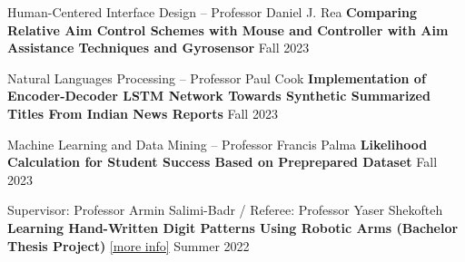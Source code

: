   \begin{cventries}
    \cventry
    {Human-Centered Interface Design -- Professor Daniel J. Rea}
    {\textbf {Comparing Relative Aim Control Schemes with Mouse and Controller with Aim Assistance Techniques and Gyrosensor}
    }
    {}
    {Fall 2023}
    {}
    \vspace{0.0 cm}

  \end{cventries}
  \begin{cventries}
    \cventry
    {Natural Languages Processing -- Professor Paul Cook}
    {\textbf {Implementation of Encoder-Decoder LSTM Network Towards Synthetic Summarized Titles From Indian News Reports}}
    {}
    {Fall 2023}
    {}
    \vspace{0.0 cm}
  
  \end{cventries}
  \begin{cventries}
    \cventry
    {Machine Learning and Data Mining -- Professor Francis Palma}
    {\textbf {Likelihood Calculation for Student Success Based on Preprepared Dataset}}
    {}
    {Fall 2023}
    {}
    \vspace{0.0 cm}
  
  
  \end{cventries}
  \begin{cventries}
    \cventry
    {Supervisor: Professor Armin Salimi-Badr / Referee: Professor Yaser Shekofteh}
    {\textbf {Learning Hand-Written Digit Patterns Using Robotic Arms (Bachelor Thesis Project)}
    \href{https://ph504.github.io/projects/projects-1/}{\textcolor{cobalt}{[more info]}}}
    {}
    {Summer 2022}
    {}
    \vspace{0.0 cm}
  \end{cventries}
